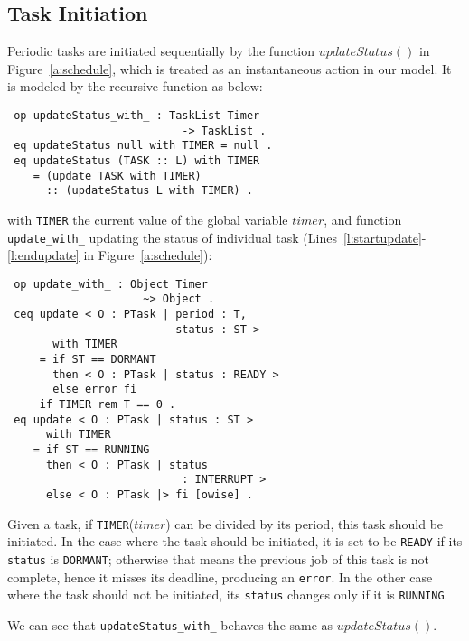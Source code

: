 \documentclass[10pt,journal]{IEEEtran}
\begin{document}
\subsection{Task Initiation}
\label{ss:init}
Periodic tasks are initiated sequentially by the function
$updateStatus()$ in Figure~\ref{a:schedule}, which is treated as an
instantaneous action in our model. It is modeled by the recursive
function as below:
\begin{verbatim}
 op updateStatus_with_ : TaskList Timer 
                           -> TaskList . 
 eq updateStatus null with TIMER = null .
 eq updateStatus (TASK :: L) with TIMER
    = (update TASK with TIMER) 
      :: (updateStatus L with TIMER) .
\end{verbatim}
with \verb|TIMER| the current value of the global variable $timer$,
and function \verb|update_with_| updating the status of individual
task (Lines~\ref{l:startupdate}-\ref{l:endupdate} in
Figure~\ref{a:schedule}):
\begin{verbatim}
 op update_with_ : Object Timer 
                     ~> Object .
 ceq update < O : PTask | period : T, 
                          status : ST > 
       with TIMER
     = if ST == DORMANT 
       then < O : PTask | status : READY >
       else error fi
     if TIMER rem T == 0 .
 eq update < O : PTask | status : ST > 
      with TIMER
    = if ST == RUNNING 
      then < O : PTask | status 
                           : INTERRUPT >
      else < O : PTask |> fi [owise] .
\end{verbatim}
Given a task, if \verb|TIMER|($timer$) can be divided by its period,
this task should be initiated.  In the case where the task should be
initiated, it is set to be \verb|READY| if its \verb|status| is
\verb|DORMANT|; otherwise that means the previous job of this task is
not complete, hence it misses its deadline, producing an
\verb|error|. In the other case where the task should not be
initiated, its \verb|status| changes only if it is \verb|RUNNING|. 

We can see that \verb|updateStatus_with_| behaves the same as
$updateStatus()$.
\end{document}
